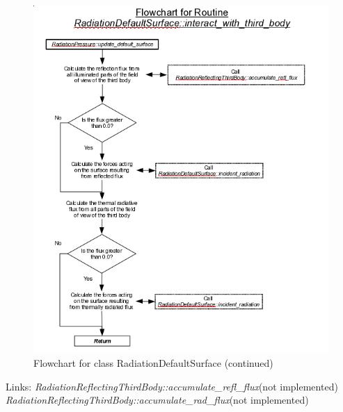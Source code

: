\begin{figure}[!ht]
  \includegraphics[width = 6 in]{figs/flowchart/flow_default_interact_with_third_body.png}
  \caption{Flowchart for class RadiationDefaultSurface (continued) }
  \label{fig:flow_default_interact_with_third_body}
\end{figure}
Links: \newline
{}\newline
\textit{RadiationReflectingThirdBody::accumulate\_refl\_flux}(not implemented) \newline
{}\newline
\textit{RadiationReflectingThirdBody::accumulate\_rad\_flux}(not implemented) \newline
\clearpage


